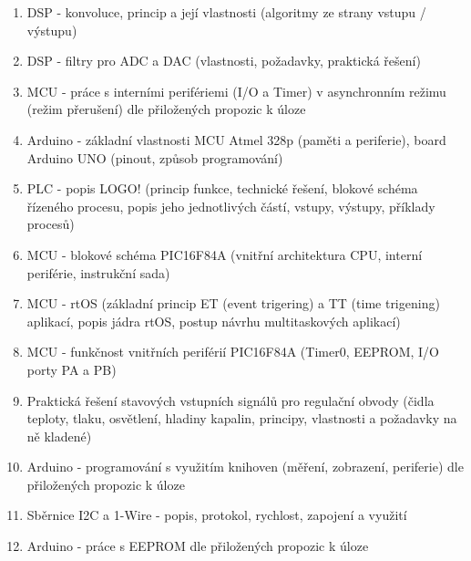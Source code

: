 \documentclass[a4paper,11pt]{article}
\begin{document}
\begin{enumerate}
    \item DSP - konvoluce, princip a její vlastnosti (algoritmy ze strany vstupu / výstupu)
    \item DSP - filtry pro ADC a DAC (vlastnosti, požadavky, praktická řešení)
    \item MCU - práce s interními perifériemi (I/O a Timer) v asynchronním režimu (režim přerušení) dle přiložených propozic k úloze
    \item Arduino - základní vlastnosti MCU Atmel 328p (paměti a periferie), board Arduino UNO (pinout, způsob programování)
    \item PLC - popis LOGO! (princip funkce, technické řešení, blokové schéma řízeného procesu, popis jeho jednotlivých částí, vstupy, výstupy, příklady procesů)
    \item MCU - blokové schéma PIC16F84A (vnitřní architektura CPU, interní periférie, instrukční sada)
    \item MCU - rtOS (základní princip ET (event trigering) a TT (time trigening) aplikací, popis jádra rtOS, postup návrhu multitaskových aplikací)
    \item MCU - funkčnost vnitřních periférií PIC16F84A (Timer0, EEPROM, I/O porty PA a PB)
    \item Praktická řešení stavových vstupních signálů pro regulační obvody (čidla teploty, tlaku, osvětlení, hladiny kapalin, principy, vlastnosti a požadavky na ně kladené)
    \item Arduino - programování s využitím knihoven (měření, zobrazení, periferie) dle přiložených propozic k úloze
    \item Sběrnice I2C a 1-Wire - popis, protokol, rychlost, zapojení a využití
    \item Arduino - práce s EEPROM dle přiložených propozic k úloze
\end{enumerate}

\end{document}
